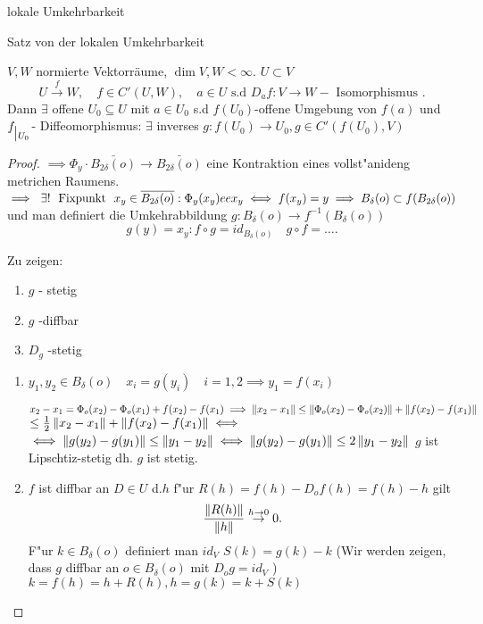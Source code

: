 \documentclass[class=article, crop=false]{standalone}
\begin{document}
\begin{zettel}{lokale Umkehrbarkeit}

\begin{flashcard}[svvujhnu]{Satz von der lokalen Umkehrbarkeit}
	\begin{theorem}
		$V,W$ normierte Vektorräume, $\dim V,W < \infty$.  $U \subset V$
		\[
			U \stackrel{f}{\to} W,\quad f \in C'(U,W),\quad a \in U \text{ s.d } D_af: V \to W - \text{ Isomorphismus }
		.\]
		Dann $\exists $ offene $U_0 \subseteq U$ mit $a \in U_0$ s.d $f( U_0 ) $-offene Umgebung von $f( a ) $ und $f _{\big{|_{U_0}}} $- Diffeomorphismus: $\exists $ inverses $g : f( U_0 ) \to U_0, g \in C'(f(U_0),V) $
	\end{theorem}
\end{flashcard}

\begin{proof}
	$\implies \Phi_y \cdot  \bar{B_{2\delta}(o)} \to  \bar{B_{2\delta}(o)}$ eine Kontraktion eines vollst"anideng metrichen Raumens. $\implies  \exists ! \tx{ Fixpunkt } x_y \in \bar{B_{2\delta}(o)}: \Phi_y(x_y) ee x_y \iff  f(x_y)= y \implies  B_{\delta}(o) \subset  f (B_{2\delta}(o)) $ und man definiert die Umkehrabbildung $g: B_{\delta}(o) \to  f^{-1}(B_{\delta}(o))$
	\[
		g(y) = x_y: f \circ  g = id_{B_{\delta}(o)} \quad g \circ  f = \dots
	.\]

	Zu zeigen:
	\begin{enumerate}
		\item $g$ - stetig
		\item $g$ -diffbar
		\item $D_g$ -stetig
	\end{enumerate}

	\begin{enumerate}
		\item $y_1, y_2 \in  B_{\delta}(o) \quad x_i = g(y_i) \quad i =1,2 \implies y_1 = f(x_i)$

		      $x_2 - x_1 = \Phi_o(x_2) - \Phi_o(x_1) + f(x_2) - f(x_1) \implies \left\|x_2 - x_1\right\| \leq  \left\|\Phi_o(x_2) - \Phi_o(x_2)\right\| + \left\| f(x_2) - f(x_1)\right\|$ $\leq  \frac{1}{2} \left\|x_2-x_1\right\| + \left\| f(x_2) - f(x_1)\right\| \iff $
		      $\iff \left\|g(y_2) - g(y_1)\right\| \leq  \left\|y_1 - y_2\right\| \iff \left\|g(y_2) - g(y_1)\right\| \leq 2\left\|y_1-y_2\right\|$
		      $g$ ist Lipschtiz-stetig dh. $g$ ist stetig.

		\item $f$ ist diffbar an $D \in  U$ d.$h$ f"ur $R(h) = f(h) - D_o f(h) = f(h) - h$  gilt
		      \[
			      \frac{\left\|R(h)\right\|}{\left\|h\right\|} \stackrel{h \to  0}{\to} 0
		      .\]
		      F"ur $k \in  B_{\delta}(o)$ definiert man $id_V$ $S(k) = g(k) - k $
		      (Wir werden zeigen, dass $g$ diffbar an $o \in  B_{\delta}(o)$ mit $D_o g = id_V$ )\\
		      $k = f(h) = h + R(h), h = g(k) = k + S(k)$


\end{enumerate}
\end{proof}
\end{zettel}
\end{document}
